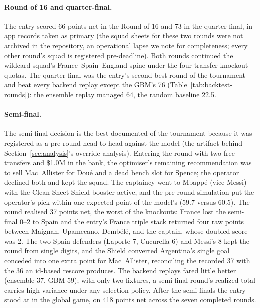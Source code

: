 \paragraph{Round of 16 and quarter-final.}
The entry scored 66 points net in the Round of 16 and 73 in the
quarter-final, in-app records taken as primary (the squad sheets for
these two rounds were not archived in the repository, an operational
lapse we note for completeness; every other round's squad is
registered pre-deadline). Both rounds continued the wildcard squad's
France--Spain--England spine under the four-transfer knockout quotas.
The quarter-final was the entry's second-best round of the
tournament and beat every backend replay except the GBM's 76
(Table~\ref{tab:backtest-rounds}): the ensemble replay managed 64,
the random baseline 22.5.

\paragraph{Semi-final.}
The semi-final decision is the best-documented of the tournament
because it was registered as a pre-round head-to-head against the
model (the artifact behind Section~\ref{sec:analysis}'s override
analysis). Entering the round with two free transfers and \$1.0M in
the bank, the optimiser's remaining recommendation was to sell
Mac~Allister for Dou\'e and a dead bench slot for Spence; the
operator declined both and kept the squad. The captaincy went to
Mbapp\'e (vice Messi) with the Clean Sheet Shield booster active,
and the pre-round simulation put the operator's pick within one
expected point of the model's (59.7 versus 60.5). The round realised
37 points net, the worst of the knockouts: France lost the
semi-final 0--2 to Spain and the entry's France triple stack
returned four raw points between Maignan, Upamecano, Demb\'el\'e,
and the captain, whose doubled score was 2. The two Spain defenders
(Laporte 7, Cucurella 6) and Messi's 8 kept the round from single
digits, and the Shield converted Argentina's single goal conceded
into one extra point for Mac~Allister, reconciling the recorded 37
with the 36 an id-based rescore produces. The backend replays fared
little better (ensemble 37, GBM 59); with only two fixtures, a
semi-final round's realized total carries high variance under any
selection policy. After the semi-finals the entry stood
at \GlobalRankSF{} in the global game, on 418 points net across the
seven completed rounds.
